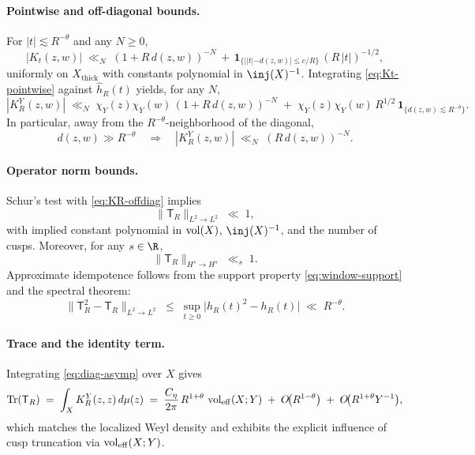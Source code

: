\paragraph{Pointwise and off-diagonal bounds.}
For $|t|\lesssim R^{-\theta}$ and any $N\ge 0$,
\begin{equation}\label{eq:Kt-pointwise}
  |K_t(z,w)| \;\ll_N\; (1+R\,d(z,w))^{-N} \,+\, \mathbf{1}_{\{||t|-d(z,w)|\le c/R\}}\,(R\,|t|)^{-1/2},
\end{equation}
uniformly on $X_{\mathrm{thick}}$ with constants polynomial in $\inj(X)^{-1}$. Integrating
\eqref{eq:Kt-pointwise} against $\widehat{h}_R(t)$ yields, for any $N$,
\begin{equation}\label{eq:KR-offdiag}
  |K_R^Y(z,w)| \;\ll_N\; \chi_Y(z)\chi_Y(w)\,(1+R\,d(z,w))^{-N} 
  \;+\; \chi_Y(z)\chi_Y(w)\,R^{1/2}\,\mathbf{1}_{\{d(z,w)\lesssim R^{-\theta}\}}.
\end{equation}
In particular, away from the $R^{-\theta}$-neighborhood of the diagonal,
\begin{equation}\label{eq:KR-rapid-decay}
  d(z,w)\gg R^{-\theta}\quad \Longrightarrow\quad |K_R^Y(z,w)| \;\ll_N\; (R\,d(z,w))^{-N}.
\end{equation}

\paragraph{Operator norm bounds.}
Schur’s test with \eqref{eq:KR-offdiag} implies
\begin{equation}\label{eq:L2-bound}
  \|\mathsf{T}_R\|_{L^2\to L^2} \;\ll\; 1,
\end{equation}
with implied constant polynomial in $\operatorname{vol}(X)$, $\inj(X)^{-1}$, and the number of cusps.
Moreover, for any $s\in\R$,
\begin{equation}\label{eq:Hs-bound}
  \|\mathsf{T}_R\|_{H^s\to H^s} \;\ll_s\; 1.
\end{equation}
Approximate idempotence follows from the support property \eqref{eq:window-support} and
the spectral theorem:
\begin{equation}\label{eq:idempotence}
  \|\mathsf{T}_R^2-\mathsf{T}_R\|_{L^2\to L^2}
  \;\le\; \sup_{t\ge 0} \big|h_R(t)^2-h_R(t)\big|
  \;\ll\; R^{-\theta}.
\end{equation}

\paragraph{Trace and the identity term.}
Integrating \eqref{eq:diag-asymp} over $X$ gives
\begin{equation}\label{eq:trace-identity}
  \mathrm{Tr}(\mathsf{T}_R) 
  \;=\; \int_X K_R^Y(z,z)\,d\mu(z)
  \;=\; \frac{C_\eta}{2\pi}\,R^{1+\theta}\,\operatorname{vol}_{\mathrm{eff}}(X;Y)
  \;+\; O\!\big(R^{1-\theta}\big) \;+\; O\!\big(R^{1+\theta}Y^{-1}\big),
\end{equation}
which matches the localized Weyl density and exhibits the explicit influence of cusp
truncation via $\operatorname{vol}_{\mathrm{eff}}(X;Y)$.

